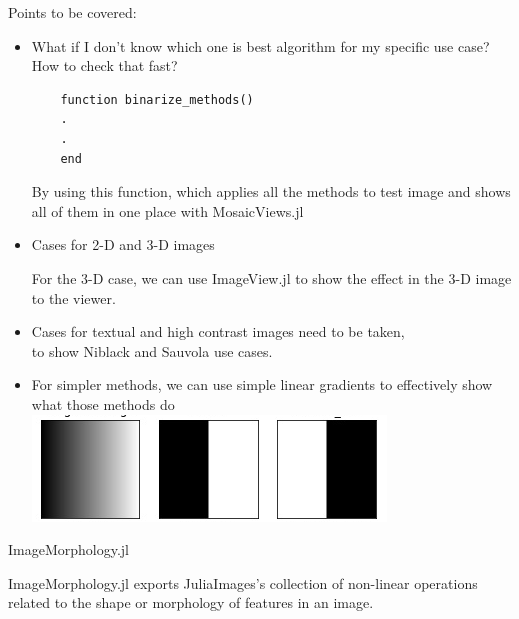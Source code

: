 Points to be covered:
\begin{itemize}[noitemsep,topsep=0pt]
    \item  What if I don't know which one is best algorithm for my specific use case?How to check that fast?
    \begin{displayquote}
    \begin{verbatim}
    function binarize_methods()
    . 
    .
    end
    \end{verbatim}
    By using this function, which applies all the methods to test image and shows all of them in one place with MosaicViews.jl
    \end{displayquote}
    \item Cases for 2-D and 3-D images
    \begin{displayquote}
    For the 3-D case, we can use ImageView.jl to show the effect in the 3-D image to the viewer.
    \end{displayquote}
    \item Cases for textual and high contrast images need to be taken,\\to show Niblack and Sauvola use cases.
    \item For simpler methods, we can use simple linear gradients to effectively show what those methods do \\
     \includegraphics[]{assets/1.png}
    \begin{displayquote}
   
    \end{displayquote}
\end{itemize}


\vspace{0.5cm}
\Large
\textsf{ImageMorphology.jl}

\vspace{0.5cm}
\large
ImageMorphology.jl exports JuliaImages's collection of non-linear operations related to the shape or morphology of features in an image.

